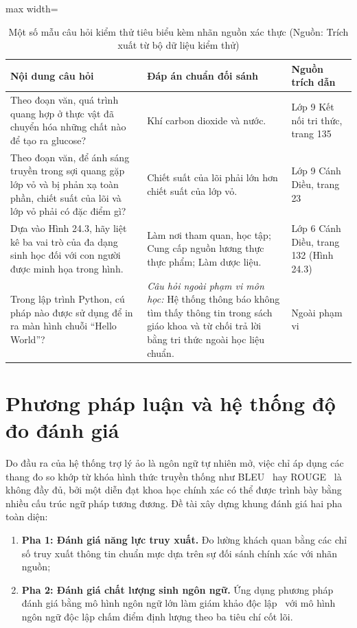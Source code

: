 \begin{table}[H]
\centering
\caption{Một số mẫu câu hỏi kiểm thử tiêu biểu kèm nhãn nguồn xác thực (Nguồn: Trích xuất từ bộ dữ liệu kiểm thử)}
\label{tab:sample_q}
\small
\begin{adjustbox}{max width=\textwidth}
\begin{tabular}{p{}p{}p{}}
\toprule
\textbf{Nội dung câu hỏi} & \textbf{Đáp án chuẩn đối sánh} & \textbf{Nguồn trích dẫn} \\
\midrule
Theo đoạn văn, quá trình quang hợp ở thực vật đã chuyển hóa những chất nào để tạo ra glucose? & Khí carbon dioxide và nước. & Lớp 9 Kết nối tri thức, trang 135 \\
\addlinespace
Theo đoạn văn, để ánh sáng truyền trong sợi quang gặp lớp vỏ và bị phản xạ toàn phần, chiết suất của lõi và lớp vỏ phải có đặc điểm gì? & Chiết suất của lõi phải lớn hơn chiết suất của lớp vỏ. & Lớp 9 Cánh Diều, trang 23 \\
\addlinespace
Dựa vào Hình 24.3, hãy liệt kê ba vai trò của đa dạng sinh học đối với con người được minh họa trong hình. & Làm nơi tham quan, học tập; Cung cấp nguồn lương thực thực phẩm; Làm dược liệu. & Lớp 6 Cánh Diều, trang 132 (Hình 24.3) \\
\addlinespace
Trong lập trình Python, cú pháp nào được sử dụng để in ra màn hình chuỗi ``Hello World''? & \textit{Câu hỏi ngoài phạm vi môn học:} Hệ thống thông báo không tìm thấy thông tin trong sách giáo khoa và từ chối trả lời bằng tri thức ngoài học liệu chuẩn. & Ngoài phạm vi \\
\bottomrule
\end{tabular}
\end{adjustbox}
\end{table}

\section{Phương pháp luận và hệ thống độ đo đánh giá}
Do đầu ra của hệ thống trợ lý ảo là ngôn ngữ tự nhiên mở, việc chỉ áp dụng các thang đo so khớp từ khóa hình thức truyền thống như BLEU~\cite{papineni2002bleu} hay ROUGE~\cite{lin2004rouge} là không đầy đủ, bởi một diễn đạt khoa học chính xác có thể được trình bày bằng nhiều cấu trúc ngữ pháp tương đương. Đề tài xây dựng khung đánh giá hai pha toàn diện:
\begin{enumerate}
    \item \textbf{Pha 1: Đánh giá năng lực truy xuất.} Đo lường khách quan bằng các chỉ số truy xuất thông tin chuẩn mực dựa trên sự đối sánh chính xác với nhãn nguồn;
    \item \textbf{Pha 2: Đánh giá chất lượng sinh ngôn ngữ.} Ứng dụng phương pháp đánh giá bằng mô hình ngôn ngữ lớn làm giám khảo độc lập~\cite{zheng2023llmjudge, liu2023geval, es2024ragas, min2023factscore, saadfalcon2023ares} với mô hình ngôn ngữ độc lập chấm điểm định lượng theo ba tiêu chí cốt lõi.
\end{enumerate}

